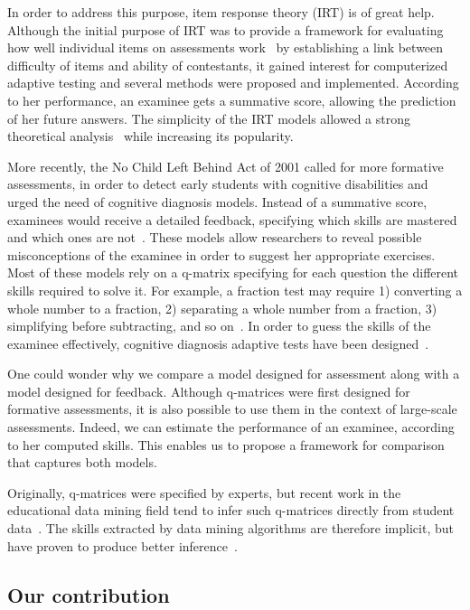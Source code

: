 \documentclass{sig-alternate}
\begin{document}
In order to address this purpose, item response theory (IRT) is of great help. Although the initial purpose of IRT was to provide a framework for evaluating how well individual items on assessments work~\citep{Hambleton1991} by establishing a link between difficulty of items and ability of contestants, it gained interest for computerized adaptive testing and several methods were proposed and implemented. According to her performance, an examinee gets a summative score, allowing the prediction of her future answers. The simplicity of the IRT models allowed a strong theoretical analysis~\citep{Baker2004} while increasing its popularity.

More recently, the No Child Left Behind Act of 2001 called for more formative assessments, in order to detect early students with cognitive disabilities and urged the need of cognitive diagnosis models. Instead of a summative score, examinees would receive a detailed feedback, specifying which skills are mastered and which ones are not~\citep{Cheng2009}. These models allow researchers to reveal possible misconceptions of the examinee in order to suggest her appropriate exercises. Most of these models rely on a q-matrix specifying for each question the different skills required to solve it. For example, a fraction test may require 1) converting a whole number to a fraction, 2) separating a whole number from a fraction, 3) simplifying before subtracting, and so on~\citep{DeLaTorreDouglas2004}. In order to guess the skills of the examinee effectively, cognitive diagnosis adaptive tests have been designed~\citep{Huebner2010}.

One could wonder why we compare a model designed for assessment along with a model designed for feedback. Although q-matrices were first designed for formative assessments, it is also possible to use them in the context of large-scale assessments. Indeed, we can estimate the performance of an examinee, according to her computed skills. This enables us to propose a framework for comparison that captures both models.

Originally, q-matrices were specified by experts, but recent work in the educational data mining field tend to infer such q-matrices directly from student data~\cite{Huebner2010}. The skills extracted by data mining algorithms are therefore implicit, but have proven to produce better inference~\citep{Barnes2003}.

\subsection{Our contribution}
\end{document}
